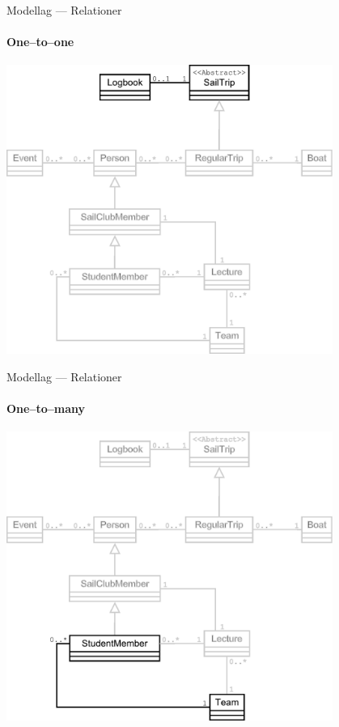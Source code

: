 \begin{frame}{Modellag --- Relationer}
  \framesubtitle{One--to--one}
  \begin{center}
    \includegraphics[width=0.8\textwidth,height=0.8\textheight,keepaspectratio]{images/One-to-one.pdf}
  \end{center}
\end{frame}

\begin{frame}{Modellag --- Relationer}
  \framesubtitle{One--to--many}
  \begin{center}
    \includegraphics[width=0.8\textwidth,height=0.8\textheight,keepaspectratio]{images/One-to-many.pdf}
  \end{center}
\end{frame}

